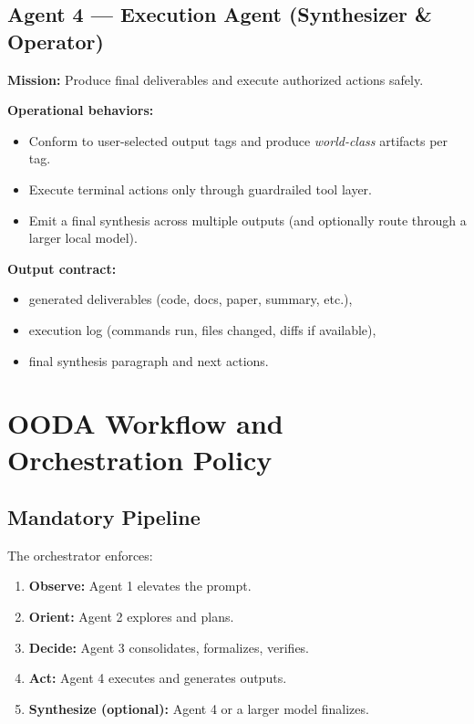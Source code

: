 \documentclass[11pt]{article}
\begin{document}
\subsection{Agent 4 --- Execution Agent (Synthesizer \& Operator)}

\textbf{Mission:} Produce final deliverables and execute authorized actions safely.

\textbf{Operational behaviors:}
\begin{itemize}
  \item Conform to user-selected output tags and produce \emph{world-class} artifacts per tag.
  \item Execute terminal actions only through guardrailed tool layer.
  \item Emit a final synthesis across multiple outputs (and optionally route through a larger local model).
\end{itemize}

\textbf{Output contract:}
\begin{itemize}
  \item generated deliverables (code, docs, paper, summary, etc.),
  \item execution log (commands run, files changed, diffs if available),
  \item final synthesis paragraph and next actions.
\end{itemize}

\section{OODA Workflow and Orchestration Policy}

\subsection{Mandatory Pipeline}

The orchestrator enforces:
\begin{enumerate}
  \item \textbf{Observe:} Agent 1 elevates the prompt.
  \item \textbf{Orient:} Agent 2 explores and plans.
  \item \textbf{Decide:} Agent 3 consolidates, formalizes, verifies.
  \item \textbf{Act:} Agent 4 executes and generates outputs.
  \item \textbf{Synthesize (optional):} Agent 4 or a larger model finalizes.
\end{enumerate}
\end{document}
